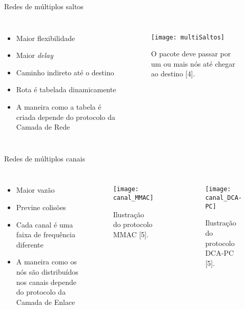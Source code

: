 \begin{frame}{Redes de múltiplos saltos}
 \begin{columns}
    \begin{itemize}
    \item Maior flexibilidade
    \item Maior \textit{delay}
    \item Caminho indireto até o destino
    \item Rota é tabelada dinamicamente
    \item A maneira como a tabela é criada depende do protocolo da Camada de Rede
    \end{itemize}

    \begin{figure}
    \setlength\itemsep{2em}
      \texttt{[image: multiSaltos]}
      \caption{O pacote deve passar por um ou mais nós até chegar ao destino [4].}
      \label{fig:multiSaltos}
    \end{figure}
  \end{columns}
\end{frame}

\begin{frame}{Redes de múltiplos canais}
 \begin{columns}
    \begin{itemize}
    \item Maior vazão
    \item Previne colisões
    \item Cada canal é uma faixa de frequência diferente
    \item A maneira como os nós são distribuídos nos canais depende do protocolo da Camada de Enlace
    \end{itemize}

    \begin{figure}
      \texttt{[image: canal\_MMAC]}
      \caption{Ilustração do protocolo MMAC [5].}
      \label{fig:canal}
    \end{figure}
    
    \begin{figure}
      \texttt{[image: canal\_DCA-PC]}
      \caption{Ilustração do protocolo DCA-PC [5].}
      \label{fig:canal}
    \end{figure}
  \end{columns}
\end{frame}



